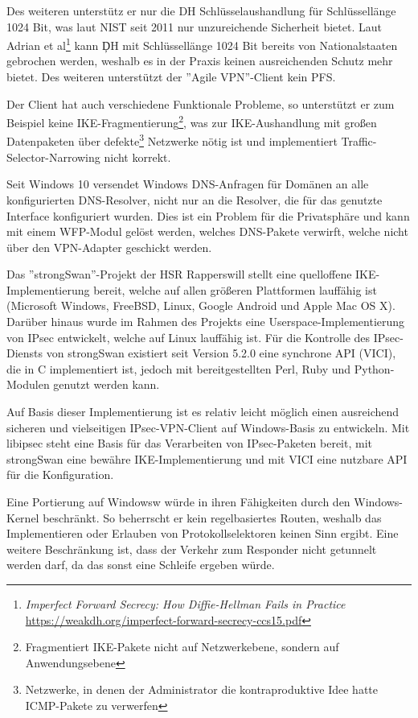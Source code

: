 \documentclass[a4paper]{article}
\begin{document}
Des weiteren unterstütz er nur die \ac{DH} Schlüsselaushandlung für
Schlüssellänge 1024 Bit, was laut NIST seit 2011 nur unzureichende Sicherheit bietet.
Laut Adrian et al\footnote{\textit{Imperfect Forward Secrecy: How Diffie-Hellman Fails in Practice} \url{https://weakdh.org/imperfect-forward-secrecy-ccs15.pdf}}
kann \c{DH} mit Schlüssellänge 1024 Bit bereits von Nationalstaaten gebrochen werden,
weshalb es in der Praxis keinen ausreichenden Schutz mehr bietet. 
Des weiteren unterstützt der ''Agile VPN''-Client kein \ac{PFS}.

Der Client hat auch verschiedene Funktionale Probleme, so unterstützt er zum Beispiel
keine IKE-Fragmentierung\footnote{Fragmentiert IKE-Pakete nicht auf Netzwerkebene, sondern auf Anwendungsebene},
was zur IKE-Aushandlung mit großen Datenpaketen über defekte\footnote{Netzwerke, in denen der Administrator die kontraproduktive Idee hatte ICMP-Pakete zu verwerfen}
Netzwerke nötig ist und implementiert Traffic-Selector-Narrowing nicht korrekt.

Seit Windows 10 versendet Windows DNS-Anfragen für Domänen an alle konfigurierten
DNS-Resolver, nicht nur an die Resolver, die für das genutzte Interface konfiguriert wurden.
Dies ist ein Problem für die Privatsphäre und kann mit einem \ac{WFP}-Modul
gelöst werden, welches DNS-Pakete verwirft, welche nicht über den VPN-Adapter
geschickt werden.


Das ''strongSwan''-Projekt der HSR Rapperswill stellt eine quelloffene
IKE-Implementierung bereit, welche auf allen größeren Plattformen lauffähig ist
(Microsoft Windows, FreeBSD, Linux, Google Android und Apple Mac OS X). 
Darüber hinaus wurde im Rahmen des Projekts eine Userspace-Implementierung von IPsec entwickelt,
welche auf Linux lauffähig ist. Für die Kontrolle des IPsec-Diensts von strongSwan
existiert seit Version 5.2.0 eine synchrone \ac{API} (\ac{VICI}), die in C implementiert ist,
jedoch mit bereitgestellten Perl, Ruby und Python-Modulen genutzt werden kann.

Auf Basis dieser Implementierung ist es relativ leicht möglich einen ausreichend
sicheren und vielseitigen IPsec-VPN-Client auf Windows-Basis zu entwickeln.
Mit libipsec steht eine Basis für das Verarbeiten von IPsec-Paketen bereit, mit strongSwan eine
bewähre IKE-Implementierung und mit \ac{VICI} eine nutzbare \ac{API} für die Konfiguration.

Eine Portierung auf Windowsw würde in ihren Fähigkeiten durch den Windows-Kernel
beschränkt. So beherrscht er kein regelbasiertes Routen, weshalb das Implementieren
oder Erlauben von Protokollselektoren keinen Sinn ergibt. Eine weitere
Beschränkung ist, dass der Verkehr zum Responder nicht getunnelt werden darf, da
das sonst eine Schleife ergeben würde.
\end{document}
